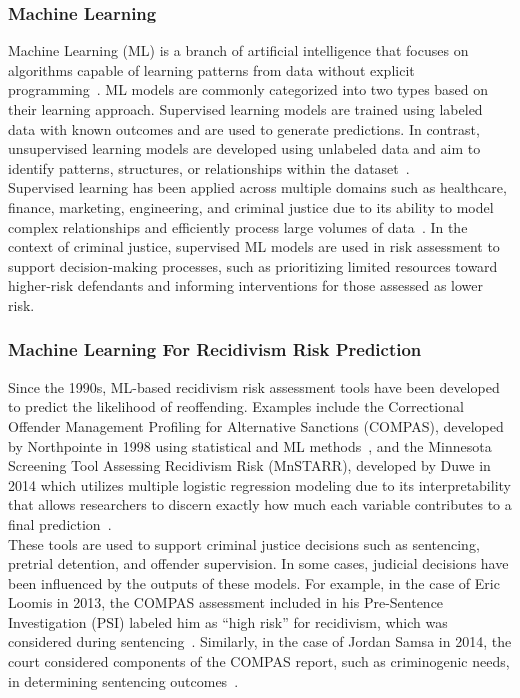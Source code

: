 \documentclass[12pt]{article}
\begin{document}
\subsubsection{Machine Learning}
\tab Machine Learning (ML) is a branch of artificial intelligence that focuses on algorithms capable of learning patterns from data without explicit programming~\cite{duwe2017out}. ML models are commonly categorized into two types based on their learning approach. Supervised learning models are trained using labeled data with known outcomes and are used to generate predictions. In contrast, unsupervised learning models are developed using unlabeled data and aim to identify patterns, structures, or relationships within the dataset~\cite{badillo2020introduction}.\\

Supervised learning has been applied across multiple domains such as healthcare, finance, marketing, engineering, and criminal justice due to its ability to model complex relationships and efficiently process large volumes of data~\cite{duwe2017out,ozkan2017predicting}. In the context of criminal justice, supervised ML models are used in risk assessment to support decision-making processes, such as prioritizing limited resources toward higher-risk defendants and informing interventions for those assessed as lower risk. 

\subsubsection{Machine Learning For Recidivism Risk Prediction}
\tab Since the 1990s, ML-based recidivism risk assessment tools have been developed to predict the likelihood of reoffending. Examples include the Correctional Offender Management Profiling for Alternative Sanctions (COMPAS), developed by Northpointe in 1998 using statistical and ML methods~\cite{northpointe2015practitioner}, and the Minnesota Screening Tool Assessing Recidivism Risk (MnSTARR), developed by Duwe in 2014 which utilizes multiple logistic regression modeling due to its interpretability that allows researchers to discern exactly how much each variable contributes to a final prediction~\cite{duwe2014development}.\\

These tools are used to support criminal justice decisions such as sentencing, pretrial detention, and offender supervision. In some cases, judicial decisions have been influenced by the outputs of these models. For example, in the case of Eric Loomis in 2013, the COMPAS assessment included in his Pre-Sentence Investigation (PSI) labeled him as “high risk” for recidivism, which was considered during sentencing~\cite{loomis2016}. Similarly, in the case of Jordan Samsa in 2014, the court considered components of the COMPAS report, such as criminogenic needs, in determining sentencing outcomes~\cite{samsa2014,liu2019beyond}.\\
\end{document}
